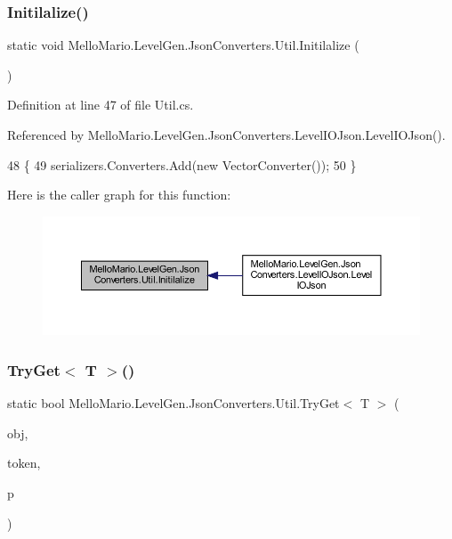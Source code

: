 \subsubsection{Initilalize()}
{\footnotesize\ttfamily static void Mello\+Mario.\+Level\+Gen.\+Json\+Converters.\+Util.\+Initilalize (\begin{DoxyParamCaption}{ }\end{DoxyParamCaption})\hspace{0.3cm}{\ttfamily [static]}}



Definition at line 47 of file Util.\+cs.



Referenced by Mello\+Mario.\+Level\+Gen.\+Json\+Converters.\+Level\+I\+O\+Json.\+Level\+I\+O\+Json().


\begin{DoxyCode}
48         \{
49             serializers.Converters.Add(\textcolor{keyword}{new} VectorConverter());
50         \}
\end{DoxyCode}
Here is the caller graph for this function\+:
\nopagebreak
\begin{figure}[H]
\begin{center}
\leavevmode
\includegraphics[width=350pt]{classMelloMario_1_1LevelGen_1_1JsonConverters_1_1Util_a0e01902dfeb87365042a42976521384e_icgraph}
\end{center}
\end{figure}
\mbox{\label{classMelloMario_1_1LevelGen_1_1JsonConverters_1_1Util_a1686272d0221d53677d017bade9c6313}} 
\subsubsection{Try\+Get$<$ T $>$()}
{\footnotesize\ttfamily static bool Mello\+Mario.\+Level\+Gen.\+Json\+Converters.\+Util.\+Try\+Get$<$ T $>$ (\begin{DoxyParamCaption}\item[{out T}]{obj,  }\item[{J\+Token}]{token,  }\item[{params string [$\,$]}]{p }\end{DoxyParamCaption})\hspace{0.3cm}{\ttfamily [static]}}



